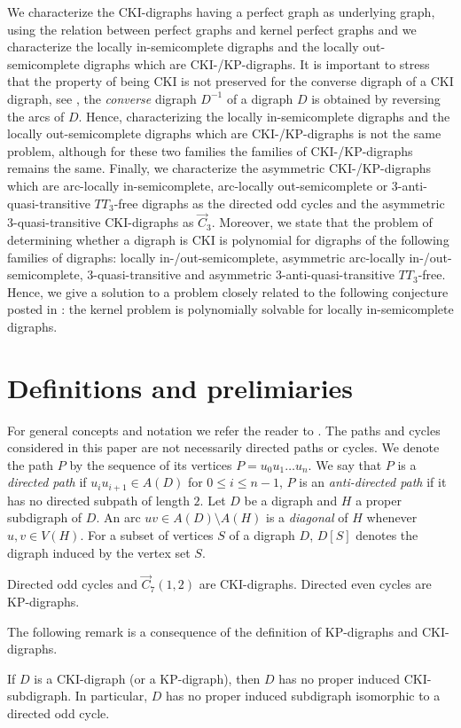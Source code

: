We  characterize the CKI-digraphs  having a perfect graph as underlying graph, using the relation between perfect graphs and kernel perfect graphs \cite{berge1990recent,boros1996perfect, galeana2012new} and we characterize the locally in-semicomplete digraphs and the locally out-semicomplete digraphs which are CKI-/KP-digraphs. It is important to stress that the property of being CKI is not preserved for the converse digraph of a CKI digraph, see \cite{duchet1981note}, the \emph{converse} digraph $D^{-1}$ of a digraph $D$ is obtained by reversing the arcs of $D$. Hence, characterizing the locally in-semicomplete digraphs and the locally out-semicomplete digraphs which are  CKI-/KP-digraphs is not the same problem, 
although for these two families the families of CKI-/KP-digraphs remains the same. 
Finally, we characterize the asymmetric CKI-/KP-digraphs which are arc-locally in-semicomplete, arc-locally out-semicomplete or $3$-anti-quasi-transitive $TT_3$-free digraphs as the directed odd cycles and the asymmetric $3$-quasi-transitive CKI-digraphs as $\overrightarrow{C}_3$.
Moreover, we state that the problem of determining whether a digraph is CKI is polynomial for digraphs of the following families of digraphs: locally in-/out-semicomplete, asymmetric arc-locally in-/out-semicomplete, $3$-quasi-transitive and asymmetric $3$-anti-quasi-transitive $TT_3$-free. Hence, we give a solution to a problem closely related to the following conjecture posted  in \cite{bang1998generalizations}: the kernel problem is polynomially solvable for locally in-semicomplete digraphs.


\section{Definitions and prelimiaries}
For general concepts and notation we refer the reader to \cite{bang2008digraphs}.
The paths and cycles considered in this paper are not necessarily directed paths or cycles.
We denote the path $P$  by the sequence of its vertices $P=u_0u_1\dots u_n$. We say that $P$ is a \emph{directed path}  if $u_iu_{i+1}\in A(D)$ for $0\le i\le n-1$, $P$ is an \emph{anti-directed path}  if it has no directed subpath of length $2$.
Let $D$ be a digraph and $H$ a proper subdigraph of $D$. An arc $uv\in A(D)\setminus A(H)$ is a \emph{diagonal} of $H$ whenever $u,v\in V(H)$.
For a subset of vertices $S$ of a digraph $D$, $D[S]$ denotes the digraph induced by the vertex set $S$.
\begin{rem}\label{CKI}
Directed odd cycles and $\overrightarrow{C}_7(1,2)$ are CKI-digraphs.  Directed even cycles are KP-digraphs.
\end{rem}
The following remark is a consequence of the definition of KP-digraphs and CKI-digraphs.
\begin{rem}\label{sub CKI}\label{subNIC}
If $D$ is a CKI-digraph (or a KP-digraph), then $D$ has no proper induced CKI-subdigraph. In particular, $D$ has no proper induced subdigraph isomorphic to  a directed odd cycle.
\end{rem}

